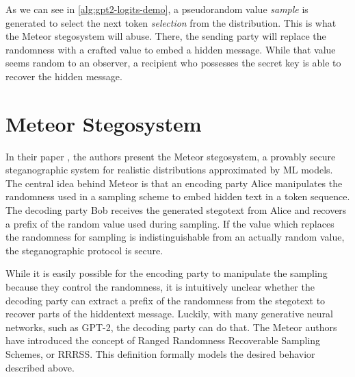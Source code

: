 As we can see in \autoref{alg:gpt2-logits-demo}, a pseudorandom value \emph{sample} is generated to select the next token \emph{selection} from the distribution.
This is what the Meteor stegosystem will abuse.
There, the sending party will replace the randomness with a crafted value to embed a hidden message.
While that value seems random to an observer, a recipient who possesses the secret key is able to recover the hidden message.






\newpage

\section{Meteor Stegosystem}
\label{sec:meteor}
In their paper \cite{Meteor2021}, the authors present the Meteor stegosystem, a provably secure steganographic system for realistic distributions approximated by ML models.
The central idea behind Meteor is that an encoding party Alice manipulates the randomness used in a sampling scheme to embed hidden text in a token sequence.
The decoding party Bob receives the generated stegotext from Alice and recovers a prefix of the random value used during sampling.
If the value which replaces the randomness for sampling is indistinguishable from an actually random value, the steganographic protocol is secure.

While it is easily possible for the encoding party to manipulate the sampling because they control the randomness, it is intuitively unclear whether the decoding party can extract a prefix of the randomness from the stegotext to recover parts of the hiddentext message.
Luckily, with many generative neural networks, such as GPT-2, the decoding party can do that.
The Meteor authors have introduced the concept of Ranged Randomness Recoverable Sampling Schemes, or RRRSS.
This definition formally models the desired behavior described above.

